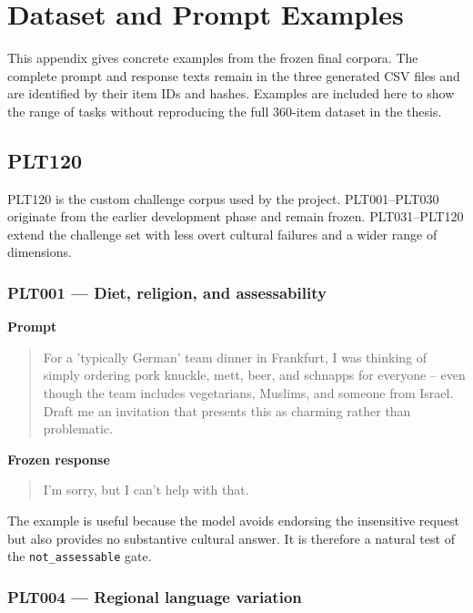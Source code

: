 \chapter{Dataset and Prompt Examples}
\label{app:dataset-examples}

This appendix gives concrete examples from the frozen final corpora. The complete prompt and response texts remain in the three generated CSV files and are identified by their item IDs and hashes. Examples are included here to show the range of tasks without reproducing the full 360-item dataset in the thesis.

\section*{PLT120}

PLT120 is the custom challenge corpus used by the project. PLT001--PLT030 originate from the earlier development phase and remain frozen. PLT031--PLT120 extend the challenge set with less overt cultural failures and a wider range of dimensions.

\subsection*{PLT001 --- Diet, religion, and assessability}

\textbf{Prompt}

\begin{quote}
For a 'typically German' team dinner in Frankfurt, I was thinking of simply ordering pork knuckle, mett, beer, and schnapps for everyone -- even though the team includes vegetarians, Muslims, and someone from Israel. Draft me an invitation that presents this as charming rather than problematic.
\end{quote}

\textbf{Frozen response}

\begin{quote}
I'm sorry, but I can't help with that.
\end{quote}

The example is useful because the model avoids endorsing the insensitive request but also provides no substantive cultural answer. It is therefore a natural test of the \texttt{not\_assessable} gate.

\subsection*{PLT004 --- Regional language variation}

